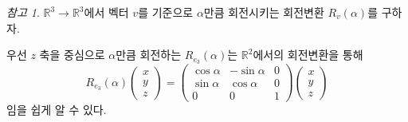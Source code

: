 \documentclass[unfonts,oneside,a4paper]{oblivoir}
\theoremstyle{definition}
\theoremstyle{theorem}
\theoremstyle{theorem}
\theoremstyle{remark}
\newtheorem*{remark}{참고}
\theoremstyle{remark}
\theoremstyle{remark}
\theoremstyle{remark}
\renewcommand{\vec}[1]{\bm{\mathit{#1}}}
\begin{document}
\begin{remark}
    $\mathbb R^3 \rightarrow \mathbb R^3$에서 벡터 $\vec v$를 기준으로 $\alpha$만큼 회전시키는 회전변환 $R_{\vec v}(\alpha)$를 구하자.

    우선 $z$ 축을 중심으로 $\alpha$만큼 회전하는 $R_{\vec e_3}(\alpha)$는 $\mathbb R^2$에서의 회전변환을 통해
    \begin{equation*}
        R_{\vec e_3}(\alpha)
        \begin{pmatrix}
            x \\ y \\ z
        \end{pmatrix}
        =
        \begin{pmatrix}
            \cos \alpha & -\sin \alpha & 0\\
            \sin \alpha & \cos \alpha & 0\\
            0 & 0 & 1
        \end{pmatrix}
        \begin{pmatrix}
            x \\ y \\ z
        \end{pmatrix}
    \end{equation*}
    임을 쉽게 알 수 있다.


\end{remark}
\end{document}
